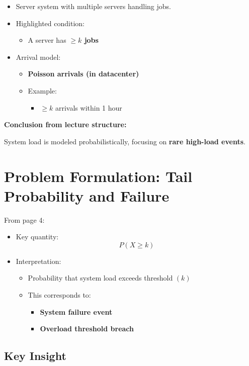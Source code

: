 \documentclass[11pt]{article}
\begin{document}
\begin{itemize}
\item Server system with multiple servers handling jobs.
\item Highlighted condition:
\begin{itemize}
\item A server has \textbf{$\ge k$ jobs}
\end{itemize}
\item Arrival model:
\begin{itemize}
\item \textbf{Poisson arrivals (in datacenter)}
\item Example:
\begin{itemize}
\item $\ge k$ arrivals within 1 hour
\end{itemize}
\end{itemize}
\end{itemize}

\textbf{Conclusion from lecture structure:}

System load is modeled probabilistically, focusing on \textbf{rare high-load events}.

\section{Problem Formulation: Tail Probability and Failure}

From page 4:

\begin{itemize}
\item Key quantity:
\[
P(X \ge k)
\]

\item Interpretation:
\begin{itemize}
\item Probability that system load exceeds threshold $(k)$
\item This corresponds to:
\begin{itemize}
\item \textbf{System failure event}
\item \textbf{Overload threshold breach}
\end{itemize}
\end{itemize}
\end{itemize}

\subsection{Key Insight}
\end{document}
